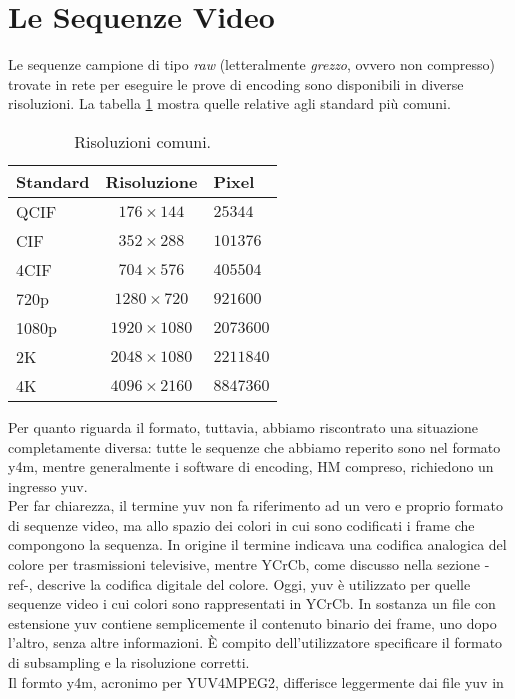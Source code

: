 \section{Le Sequenze Video}
Le sequenze campione di tipo \emph{raw} (letteralmente \emph{grezzo}, ovvero 
non compresso) 
trovate in rete per 
eseguire le prove di encoding sono disponibili in diverse risoluzioni. La 
tabella \ref{tabel-resolutions} mostra quelle relative agli standard più comuni.

	\begin{table}[h!]
		\centering
	\begin{tabular}{|l|c|l|}
		\hline
		Standard & Risoluzione & Pixel \\ \hline \hline \hline
		QCIF & $176\times144$ & $25344$ \\ \hline
		CIF & $352\times288$ & $101376$ \\ \hline
		4CIF & $704\times576$ & $405504$ \\ \hline
		720p & $1280\times720$ & $921600$ \\ \hline
		1080p & $1920\times1080$ & $2073600$ \\ \hline
		2K & $2048\times1080$ & $2211840$ \\ \hline
		4K & $4096\times2160$ & $8847360$ \\ \hline
	\end{tabular}
	\caption{Risoluzioni comuni.}
	\label{tabel-resolutions}
	\end{table}
Per quanto riguarda il formato, tuttavia, 
abbiamo riscontrato una situazione completamente diversa: tutte le sequenze che 
abbiamo reperito sono nel formato y4m, mentre generalmente i software di 
encoding, HM compreso, richiedono un ingresso yuv.\\
Per far chiarezza, il termine yuv non fa riferimento ad un vero e proprio 
formato di sequenze video, ma allo spazio dei colori in cui sono codificati i 
frame che compongono la sequenza. In origine il termine indicava una codifica 
analogica del colore per trasmissioni televisive, mentre YCrCb, come discusso 
nella sezione -ref-, descrive la codifica digitale del colore. Oggi, yuv è 
utilizzato per quelle sequenze video i cui colori sono rappresentati in YCrCb.
In sostanza un file con estensione yuv contiene semplicemente il contenuto 
binario dei frame, uno dopo l'altro, senza altre informazioni. \`E compito 
dell'utilizzatore specificare il formato di subsampling e la risoluzione 
corretti.\\
Il formto y4m, acronimo per YUV4MPEG2, differisce leggermente dai file yuv in 
